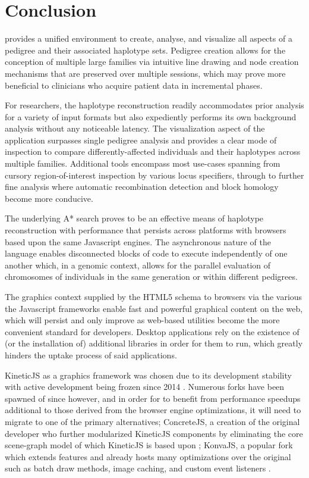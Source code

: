 \section{Conclusion}

\app provides a unified environment to create, analyse, and visualize all aspects of a pedigree and their associated haplotype sets. Pedigree creation allows for the conception of multiple large families via intuitive line drawing and node creation mechanisms that are preserved over multiple sessions, which may prove more beneficial to clinicians who acquire patient data in incremental phases.

For researchers, the haplotype reconstruction readily accommodates prior analysis for a variety of input formats but also expediently performs its own background analysis without any noticeable latency. The visualization aspect of the application surpasses single pedigree analysis and provides a clear mode of inspection to compare differently-affected individuals and their haplotypes across multiple families. Additional tools encompass most use-cases spanning from cursory region-of-interest inspection by various locus specifiers, through to further fine analysis where automatic recombination detection and block homology become more conducive.

The underlying A* search proves to be an effective means of haplotype reconstruction with performance that persists across platforms with browsers based upon the same Javascript engines. The asynchronous nature of the language enables disconnected blocks of code to execute independently of one another which, in a genomic context, allows for the parallel evaluation of chromosomes of individuals in the same generation or within different pedigrees. 

The graphics context supplied by the HTML5 schema to browsers via the various the Javascript frameworks enable fast and powerful graphical content on the web, which will persist and only improve as web-based utilities become the more convenient standard for developers. Desktop applications rely on the existence of (or the installation of) additional libraries in order for them to run, which greatly hinders the uptake process of said applications.

KineticJS as a graphics framework was chosen due to its development stability with active development being frozen since 2014 \citep{kinetictar}. Numerous forks have been spawned of since however, and in order for \app to benefit from performance speedups additional to those derived from the browser engine optimizations, it will need to migrate to one of the primary alternatives; ConcreteJS, a creation of the original developer who further modularized KineticJS components by eliminating the core scene-graph model of which KineticJS is based upon \citep{concretejs}; KonvaJS, a popular fork which extends features and already hosts many optimizations over the original such as batch draw methods, image caching, and custom event listeners \citep{konvajs}.


